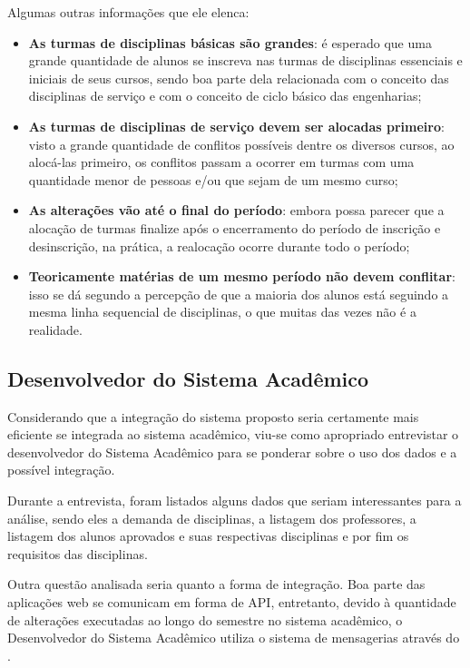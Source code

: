 Algumas outras informações que ele elenca:

\begin{itemize}
  \item \textbf{As turmas de disciplinas básicas são grandes}: é esperado que uma grande quantidade de alunos se inscreva nas turmas de disciplinas essenciais e iniciais de seus cursos, sendo boa parte dela relacionada com o conceito das disciplinas de serviço e com o conceito de ciclo básico das engenharias;
  \item \textbf{As turmas de disciplinas de serviço devem ser alocadas primeiro}: visto a grande quantidade de conflitos possíveis dentre os diversos cursos, ao alocá-las primeiro, os conflitos passam a ocorrer em turmas com uma quantidade menor de pessoas e/ou que sejam de um mesmo curso;
  \item \textbf{As alterações vão até o final do período}: embora possa parecer que a alocação de turmas finalize após o encerramento do período de inscrição e desinscrição, na prática, a realocação ocorre durante todo o período;
  \item \textbf{Teoricamente matérias de um mesmo período não devem conflitar}: isso se dá segundo a percepção de que a maioria dos alunos está seguindo a mesma linha sequencial de disciplinas, o que muitas das vezes não é a realidade.
\end{itemize}

\subsection{Desenvolvedor do Sistema Acadêmico} \label{ssec:3_Desenvolvedor} %

Considerando que a integração do sistema proposto seria certamente mais eficiente se integrada ao sistema acadêmico, viu-se como apropriado entrevistar o desenvolvedor do Sistema Acadêmico para se ponderar sobre o uso dos dados e a possível integração.

Durante a entrevista, foram listados alguns dados que seriam interessantes para a análise, sendo eles a demanda de disciplinas, a listagem dos professores, a listagem dos alunos aprovados e suas respectivas disciplinas e por fim os requisitos das disciplinas.


Outra questão analisada seria quanto a forma de integração. Boa parte das aplicações web se comunicam em forma de API, entretanto, devido à quantidade de alterações executadas ao longo do semestre no sistema acadêmico, o Desenvolvedor do Sistema Acadêmico utiliza o sistema de mensagerias através do .

